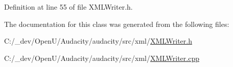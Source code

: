 Definition at line 55 of file X\+M\+L\+Writer.\+h.



The documentation for this class was generated from the following files\+:\begin{DoxyCompactItemize}
\item 
C\+:/\+\_\+dev/\+Open\+U/\+Audacity/audacity/src/xml/\hyperlink{_x_m_l_writer_8h}{X\+M\+L\+Writer.\+h}\item 
C\+:/\+\_\+dev/\+Open\+U/\+Audacity/audacity/src/xml/\hyperlink{_x_m_l_writer_8cpp}{X\+M\+L\+Writer.\+cpp}\end{DoxyCompactItemize}
